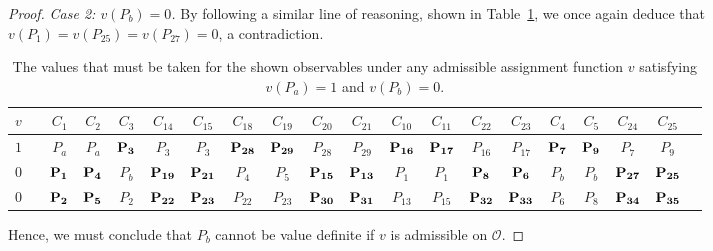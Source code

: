 \documentclass[%
 superscriptaddress,
 preprint,
 showpacs,
 showkeys,
 nofootinbib,
  amsmath,amssymb,
  aps,
  longbibliography,
  floatfix,
 ]{revtex4-1}
\theoremstyle{definition}
\begin{document}
\begin{proof}
	\emph{Case 2: $v(P_b)=0$.}
	By following a similar line of reasoning, shown in Table~\ref{table:proofTable2}, we once again deduce that $v(P_1)=v(P_{25})=v(P_{27})=0$, a contradiction.
	
	
	\begin{table}[ht]
		\setlength{\tabcolsep}{6pt}
		\caption{The values that must be taken for the shown observables under any admissible assignment function $v$ satisfying $v(P_a)=1$ and $v(P_b)=0$.}
		\begin{tabular}{cccccccccccccccccccc}
		\hline
		$v$ && $C_1$ & $C_2$ & $C_3$ & $C_{14}$ & $C_{15}$ & $C_{18}$ & $C_{19}$ & $C_{20}$ & $C_{21}$ & $C_{10}$ & $C_{11}$ & $C_{22}$ & $C_{23}$ & $C_4$ & $C_5$ & $C_{24}$ & $C_{25}$\\
		\hline
		\hline
		$1$ && $P_a$ & $P_a$ & $\bf P_3$ & $P_3$ & $P_3$ & $\bf P_{28}$ & $\bf P_{29}$ & $P_{28}$ & $P_{29}$ & $\bf P_{16}$ & $\bf P_{17}$ & $P_{16}$ & $P_{17}$ & $\bf P_7$ & $\bf P_9$ & $P_7$ & $P_9$\\
		$0$ && $\bf P_1$ & $\bf P_4$ & $P_b$ & $\bf P_{19}$ & $\bf P_{21}$ & $P_4$ & $P_5$ & $\bf P_{15}$ & $\bf P_{13}$ & $P_1$ & $P_1$ & $\bf P_8$ & $\bf P_6$ & $P_b$ & $P_b$ & $\bf P_{27}$ & $\bf P_{25}$\\
		$0$ && $\bf P_2$ & $\bf P_5$ & $P_2$ & $\bf P_{22}$ & $\bf P_{23}$ & $P_{22}$ & $P_{23}$ & $\bf P_{30}$ & $\bf P_{31}$ & $P_{13}$ & $P_{15}$ & $\bf P_{32}$ & $\bf P_{33}$ & $P_6$ & $P_8$ & $\bf P_{34}$ & $\bf P_{35}$\\
		\hline
		\end{tabular}
		\label{table:proofTable2}
	\end{table}
	
	Hence, we must conclude that $P_b$ cannot be value definite if $v$ is admissible on $\mathcal{O}$.
\end{proof}
\end{document}
